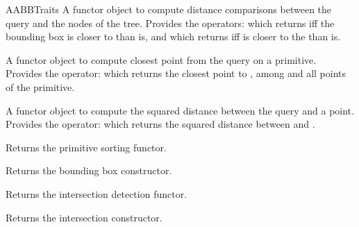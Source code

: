 \begin{ccRefConcept}{AABBTraits}
{} 
{A functor object to compute distance comparisons between the query and the nodes of the tree. Provides the operators:
 which returns  iff the bounding box is closer to  than  is, and  which returns  iff  is closer to the  than  is.}

{} 
{A functor object to compute closest point from the query on a primitive. Provides the operator:
 which returns the closest point to , among  and all points of the primitive.}

{A functor object to compute the squared distance between the query and a point. Provides the operator:
 which returns the squared distance between  and .}

\ccCreation
{}  %


\ccOperations

{Returns the primitive sorting functor.}

{Returns the bounding box constructor.}

{Returns the intersection detection functor.}

{Returns the intersection constructor.}


\end{ccRefConcept}
